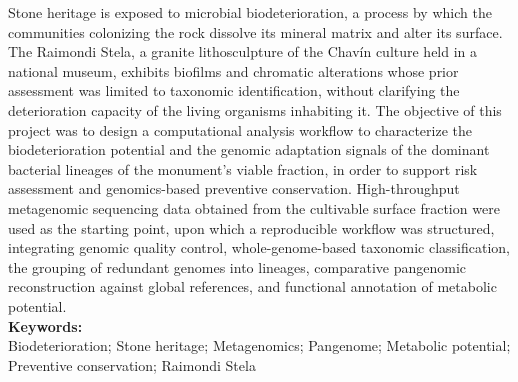 

Stone heritage is exposed to microbial biodeterioration, a process by which the communities colonizing the rock dissolve its mineral matrix and alter its surface. The Raimondi Stela, a granite lithosculpture of the Chavín culture held in a national museum, exhibits biofilms and chromatic alterations whose prior assessment was limited to taxonomic identification, without clarifying the deterioration capacity of the living organisms inhabiting it. The objective of this project was to design a computational analysis workflow to characterize the biodeterioration potential and the genomic adaptation signals of the dominant bacterial lineages of the monument's viable fraction, in order to support risk assessment and genomics-based preventive conservation. High-throughput metagenomic sequencing data obtained from the cultivable surface fraction were used as the starting point, upon which a reproducible workflow was structured, integrating genomic quality control, whole-genome-based taxonomic classification, the grouping of redundant genomes into lineages, comparative pangenomic reconstruction against global references, and functional annotation of metabolic potential.  \\


\noindent \textbf{Keywords:}\\
\noindent  Biodeterioration; Stone heritage; Metagenomics; Pangenome;
Metabolic potential; Preventive conservation; Raimondi Stela



